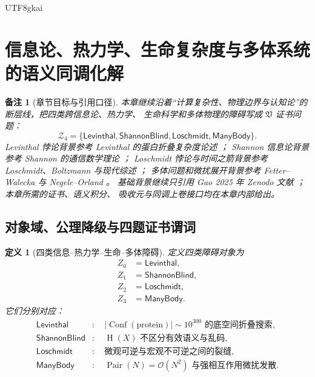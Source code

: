 \documentclass[12pt]{article}
\newtheorem{definition}{定义}[section]
\newtheorem{remark}{备注}[section]
\newcommand{\Vsys}{\mathfrak V}
\DeclareMathOperator{\Conf}{Conf}
\DeclareMathOperator{\Entropy}{H}
\DeclareMathOperator{\Pair}{Pair}
\begin{document}
\begin{CJK*}{UTF8}{gkai}
\section{信息论、热力学、生命复杂度与多体系统的语义同调化解}
\label{sec:tex59-info-thermo-life-manybody}

\begin{remark}[章节目标与引用口径]
本章继续沿着“计算复杂性、物理边界与认知论”的断层线，把四类跨信息论、热力学、
生命科学和多体物理的障碍写成 \(\Vsys\) 证书问题：
\[
  \mathcal Z_4
  =
  \{\mathsf{Levinthal},\mathsf{ShannonBlind},\mathsf{Loschmidt},\mathsf{ManyBody}\}.
\]
Levinthal 悖论背景参考 Levinthal 的蛋白折叠复杂度论述
\cite{Levinthal1969ProteinFolding,DillMacCallum2012ProteinFolding}；
Shannon 信息论背景参考 Shannon 的通信数学理论 \cite{Shannon1948Communication}；
Loschmidt 悖论与时间之箭背景参考 Loschmidt、Boltzmann 与现代综述
\cite{Loschmidt1876SecondLaw,Boltzmann1877SecondLaw,Price1996TimeArrow}；
多体问题和微扰展开背景参考 Fetter--Walecka 与 Negele--Orland
\cite{FetterWalecka1971ManyParticle,NegeleOrland1988QuantumManyParticle}。
基础背景继续只引用 Gao 2025 年 Zenodo 文献 \cite{Gao2025PureMathZenodo}；本章所需的证书、语义积分、
吸收元与同调上卷接口均在本章内部给出。
\end{remark}

\subsection{对象域、公理降级与四题证书谓词}
\label{subsec:tex59-z4-objects}

\begin{definition}[四类信息--热力学--生命--多体障碍]
\label{def:tex59-z4-objects}
定义四类障碍对象为
\[
\begin{aligned}
  Z_0&=\mathsf{Levinthal},\\
  Z_1&=\mathsf{ShannonBlind},\\
  Z_2&=\mathsf{Loschmidt},\\
  Z_3&=\mathsf{ManyBody}.
\end{aligned}
\]
它们分别对应：
\[
\begin{aligned}
  \mathsf{Levinthal} &: \quad |\Conf(\text{protein})|\sim 10^{300}\text{ 的底空间折叠搜索},\\
  \mathsf{ShannonBlind} &: \quad \Entropy(X)\text{ 不区分有效语义与乱码},\\
  \mathsf{Loschmidt} &: \quad \text{微观可逆与宏观不可逆之间的裂缝},\\
  \mathsf{ManyBody} &: \quad \Pair(N)=\mathcal O(N^2)\text{ 与强相互作用微扰发散}.
\end{aligned}
\]
\end{definition}


\end{CJK*}
\end{document}
